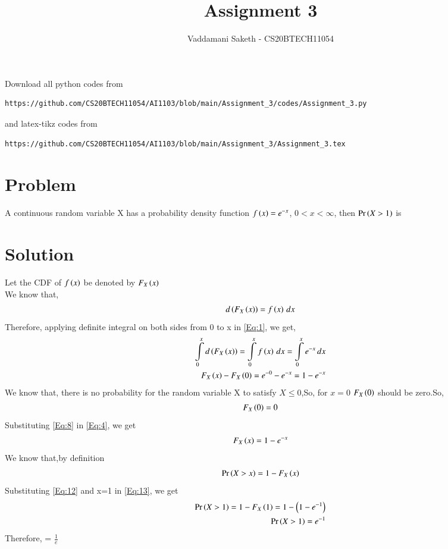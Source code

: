 \documentclass[journal,12pt,twocolumn]{IEEEtran}
\begin{document}
     \def\rightbox#1{\makebox[0in][r]{#1}}
     \def\centbox#1{\makebox[0in]{#1}}
     \def\topbox#1{\raisebox{-\baselineskip}[0in][0in]{#1}}
     \def\midbox#1{\raisebox{-0.5\baselineskip}[0in][0in]{#1}}
\vspace{3cm}
\title{Assignment 3}
\author{Vaddamani Saketh - CS20BTECH11054}
\maketitle
\newpage
\bigskip
\renewcommand{\thefigure}{\theenumi}
\renewcommand{\thetable}{\theenumi}
Download all python codes from 
\begin{lstlisting}
https://github.com/CS20BTECH11054/AI1103/blob/main/Assignment_3/codes/Assignment_3.py
\end{lstlisting}
%
and latex-tikz codes from 
%
\begin{lstlisting}
https://github.com/CS20BTECH11054/AI1103/blob/main/Assignment_3/Assignment_3.tex
\end{lstlisting}
\section{Problem}
A continuous random variable X has a probability density function $f\left(x\right)=e^{-x}$, $0<x<\infty$, then  $\Pr\left(X>1\right)$ is

\section{Solution}
Let the CDF of $f\left(x\right)$ be denoted by $F_X\left(x\right)$ \\
We know that,
\begin{align}
d\left(F_X\left(x\right)\right) = f\left(x\right) \,dx \label{Eq:1}
\end{align}
Therefore, applying definite integral on both sides from 0 to x in \eqref{Eq:1}, we get,
\begin{align}
\int\limits_{0}^{x} d\left(F_X\left(x\right)\right) = \int\limits_{0}^{x} f\left(x\right) \,dx = \int\limits_{0}^{x} e^{-x} \,dx \notag \\
F_X\left(x\right) - F_X\left(0\right) = e^{-0} - e^{-x} = 1 - e^{-x}   \label{Eq:4}
\end{align}
We know that, there is no probability for the random variable X to satisfy $X \leq 0$,So, for $x = 0$ $F_X\left(0\right)$ should be zero.So,
\begin{align}
F_X\left(0\right) = 0 \label{Eq:8}
\end{align}
Substituting \eqref{Eq:8} in \eqref{Eq:4}, we get
\begin{align}
F_X\left(x\right) = 1 - e^{-x} \label{Eq:12}
\end{align}
We know that,by definition 
\begin{align}
\Pr\left(X > x\right) = 1-F_X\left(x\right) \label{Eq:13}
\end{align}
Substituting \eqref{Eq:12} and x=1 in \eqref{Eq:13}, we get
\begin{align}
\Pr\left(X>1\right)=1-F_X\left(1\right)=1-\left(1-e^{-1}\right) \\
\Pr\left(X>1\right)=e^{-1}
\end{align}
Therefore,  = $\frac{1}{e}$
\newpage
\end{document}
